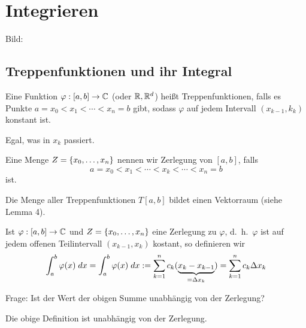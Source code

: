 \documentclass[../ana2.tex]{subfiles}
\begin{document}
\setcounter{section}{3}
\section{Integrieren}
Bild:
\subsection{Treppenfunktionen und ihr Integral}
\begin{defi}
    Eine Funktion \( \abb{\varphi}{[a,b]}{\C} \) 
    (oder \(\R, \R^d\))
    heißt Treppenfunktionen, falls es Punkte 
    \( a=x_0 < x_1 < \cdots < x_n = b \) gibt, sodass 
    \( \varphi \) auf jedem Intervall \( (x_{k-1}, k_k) \)
    konstant ist.    
\end{defi}
\begin{bem}
    Egal, was in \(x_k\) passiert.
\end{bem}
\begin{bem}
    Eine Menge \( Z = \set{x_0, \ldots, x_n} \) nennen 
    wir Zerlegung von \( [a,b] \), falls 
    \[ a = x_0 < x_1 < \cdots < x_k < \cdots < x_n = b \]
    ist.
\end{bem}
Die Menge aller Treppenfunktionen \( T[a,b] \) bildet 
einen Vektorraum (siehe Lemma 4).
\begin{defi}
    Ist \( \abb{\varphi}{[a,b]}{\C} \) und 
    \( Z = \set{x_0, \ldots, x_n} \) eine Zerlegung 
     zu \( \varphi \), d.\ h.\  \( \varphi \) 
    ist auf jedem offenen Teilintervall \( (x_{k-1}, x_k) \) 
    kostant, so definieren wir 
    \[ \integral{\varphi(x)}{a}{b} = \integral{\varphi(x)}{a}{b} 
    := \sum_{k=1}^n c_k (\underbrace{x_k - x_{k-1}}_{= \Delta x_k})
    = \sum_{k=1}^n c_k \Delta x_k \]
\end{defi}
Frage: Ist der Wert der obigen Summe unabhängig von der Zerlegung?
\begin{lem}
    Die obige Definition ist unabhängig von der Zerlegung.
\end{lem}
\end{document}
